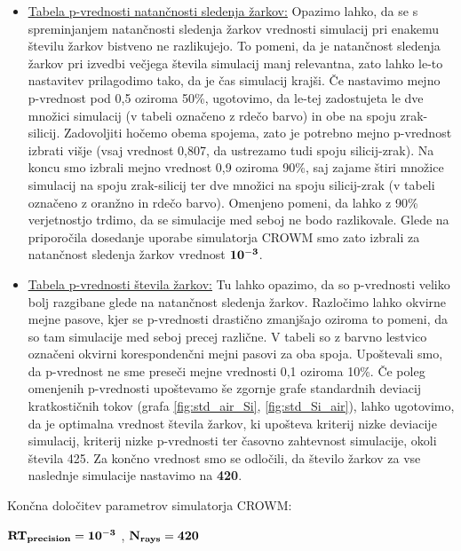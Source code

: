 \documentclass[a4paper,twoside,openright,12pt,slovene]{book}
\begin{document}
\begin{itemize}
    \item \underline{\hyperref[tab:pSled]{Tabela p-vrednosti natančnosti sledenja žarkov:}} Opazimo lahko, da se s spreminjanjem natančnosti sledenja žarkov vrednosti simulacij pri enakemu številu žarkov bistveno ne razlikujejo. To pomeni, da je natančnost sledenja žarkov pri izvedbi večjega števila simulacij manj relevantna, zato lahko le-to nastavitev prilagodimo tako, da je čas simulacij krajši. Če nastavimo mejno p-vrednost pod 0,5 oziroma 50\%, ugotovimo, da le-tej zadostujeta le dve množici simulacij (v tabeli označeno z rdečo barvo) in obe na spoju zrak-silicij. Zadovoljiti hočemo obema spojema, zato je potrebno mejno p-vrednost izbrati višje (vsaj vrednost 0,807, da ustrezamo tudi spoju silicij-zrak). Na koncu smo izbrali mejno vrednost 0,9 oziroma 90\%, saj zajame štiri množice simulacij na spoju zrak-silicij ter dve množici na spoju silicij-zrak (v tabeli označeno z oranžno in rdečo barvo). Omenjeno pomeni, da lahko z 90\% verjetnostjo trdimo, da se simulacije med seboj ne bodo razlikovale. Glede na priporočila dosedanje uporabe simulatorja CROWM smo zato izbrali za natančnost sledenja žarkov vrednost $\bf 10^{-3}$.
    
    \item \underline{\hyperref[tab:pŽarek]{Tabela p-vrednosti števila žarkov:}} Tu lahko opazimo, da so p-vrednosti veliko bolj razgibane glede na natančnost sledenja žarkov. Razločimo lahko okvirne mejne pasove, kjer se p-vrednosti drastično zmanjšajo oziroma to pomeni, da so tam simulacije med seboj precej različne. V tabeli so z barvno lestvico označeni okvirni korespondenčni mejni pasovi za oba spoja. Upoštevali smo, da p-vrednost ne sme preseči mejne vrednosti 0,1 oziroma 10\%. Če poleg omenjenih p-vrednosti upoštevamo še zgornje grafe standardnih deviacij kratkostičnih tokov (grafa \ref{fig:std_air_Si}, \ref{fig:std_Si_air}), lahko ugotovimo, da je optimalna vrednost števila žarkov, ki upošteva kriterij nizke deviacije simulacij, kriterij nizke p-vrednosti ter časovno zahtevnost simulacije, okoli števila 425. Za končno vrednost smo se odločili, da število žarkov za vse naslednje simulacije nastavimo na \textbf{420}.
\end{itemize}

Končna določitev parametrov simulatorja CROWM: 

\hspace{\parindent} $\bf RT_{precision} = 10^{-3}$ , $\bf N_{rays} = 420$
\end{document}
